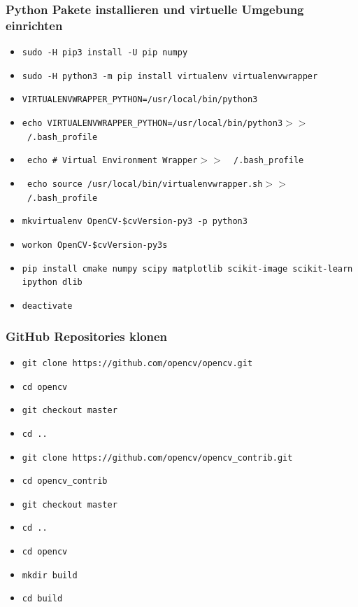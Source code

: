 \subsubsection{Python Pakete installieren und virtuelle Umgebung einrichten } 
\begin{itemize}
	\item \texttt{sudo -H pip3 install -U pip numpy}
	\item \texttt{sudo -H python3 -m pip install virtualenv virtualenvwrapper}
	\item \texttt{VIRTUALENVWRAPPER\_PYTHON=/usr/local/bin/python3}
	\item \texttt{echo \grqq VIRTUALENVWRAPPER\_PYTHON=/usr/local/bin/python3\grqq  $>$$>$ \newline ~/.bash\_profile}
	\item \texttt{	echo \grqq \# Virtual Environment Wrapper\grqq $>$$>$ ~/.bash\_profile}
	\item \texttt{ 	echo \grqq source /usr/local/bin/virtualenvwrapper.sh\grqq $>$$>$ ~/.bash\_profile }
	\item \texttt{mkvirtualenv OpenCV-\grqq\$cvVersion\grqq-py3 -p python3}	
	\item \texttt{workon OpenCV-\grqq\$cvVersion\grqq -py3s	}
	\item \texttt{pip install cmake numpy scipy matplotlib scikit-image scikit-learn ipython dlib}
	\item \texttt{deactivate}	
\end{itemize}

\subsubsection{GitHub Repositories klonen } 
\begin{itemize}
	\item \texttt{git clone https://github.com/opencv/opencv.git}
	\item \texttt{cd opencv}	
	\item \texttt{git checkout master}	
	\item \texttt{cd ..}
	\item \texttt{git clone https://github.com/opencv/opencv\_contrib.git}
	\item \texttt{cd opencv\_contrib}	
	\item \texttt{git checkout master}	
	\item \texttt{cd ..}
	\item \texttt{cd opencv}
	\item \texttt{mkdir build}	
	\item \texttt{cd build}	
	
\end{itemize}

